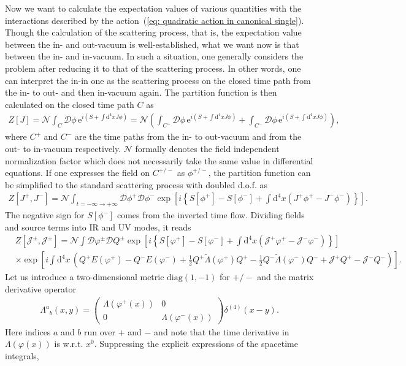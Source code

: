 \documentclass[aps, prd
, preprint
, nofootinbib 
]{revtex4-1}
\newcommand{\dd}{\mathrm{d}}
\newcommand{\ee}{\mathrm{e}}
\newcommand{\bae}[1]{\begin{align} #1 \end{align}}
\newcommand{\bpme}[1]{\begin{pmatrix} #1 \end{pmatrix}}
\begin{document}
Now we want to calculate the expectation values of various quantities with the interactions described by 
the action~(\ref{eq: quadratic action in canonical single}).
Though the calculation of the scattering process, that is, the expectation value between the in- and out-vacuum is well-established,
what we want now is that between the in- and in-vacuum. In such a situation, one generally considers the problem after reducing it to
that of the scattering process.
In other words, one can interpret the in-in one as the scattering process on the closed time path from the in- to out- and then in-vacuum again.
The partition function is then calculated on the closed time path $C$ as
\bae{
	Z[J]=\mathcal{N}\int_C\mathscr{D}\phi\,\ee^{i\left(S+\int\dd^4xJ\phi\right)}
	=\mathcal{N}\left(\int_{C^+}\mathscr{D}\phi\,\ee^{i\left(S+\int\dd^4xJ\phi\right)}+\int_{C^-}\mathscr{D}\phi\,\ee^{i\left(S+\int\dd^4xJ\phi\right)}\right),
}
where $C^+$ and $C^-$ are the time paths from the in- to out-vacuum and from the out- to in-vacuum respectively.
$\mathcal{N}$ formally denotes the field independent normalization factor which does not necessarily take the same value
in differential equations.
If one expresses the field on $C^{+/-}$ as $\phi^{+/-}$, the partition function can be simplified to the standard 
scattering process with doubled d.o.f. as
\bae{
	Z[J^+,J^-]=\mathcal{N}\int_{t=-\infty\to+\infty}\mathscr{D}\phi^+\mathscr{D}\phi^-
	\exp\left[i\left\{S[\phi^+]-S[\phi^-]+\int\dd^4x\left(J^+\phi^+-J^-\phi^-\right)\right\}\right].
}
The negative sign for $S[\phi^-]$ comes from the inverted time flow.
Dividing fields and source terms into IR and UV modes, it reads
\bae{
	&Z[\mathcal{J}^\pm,\mathscr{J}^\pm]=\mathcal{N}\int\mathscr{D}\varphi^{\pm}\mathscr{D}Q^{\pm} 
	\exp\left[i\left\{S[\varphi^+]-S[\varphi^-]
	+\int\dd^4x\left(\mathcal{J}^+\varphi^+-\mathcal{J}^-\varphi^-\right)\right\}\right] \nonumber \\
	&\times\exp\left[i\int\dd^4x\,\left(Q^+E(\varphi^+)-Q^-E(\varphi^-)
	+\frac{1}{2}Q^+\tilde{\Lambda}(\varphi^+)Q^+-\frac{1}{2}Q^-\tilde{\Lambda}(\varphi^-)Q^-
	+\mathscr{J}^+Q^+-\mathscr{J}^-Q^-\right)\right].
}
Let us introduce a two-dimensional metric $\text{diag}(1,-1)$ for $+/-$ and the matrix derivative operator
\bae{
	\Lambda^a{}_b(x,y)=
	\bpme{
		\Lambda(\varphi^+(x)) & 0 \\
		0 & \Lambda(\varphi^-(x))
	}
	\delta^{(4)}(x-y).
}
Here indices $a$ and $b$ run over $+$ and $-$ and note that the time derivative in $\Lambda(\varphi(x))$ is w.r.t. $x^0$.
Suppressing the explicit expressions of the spacetime integrals,
\end{document}

